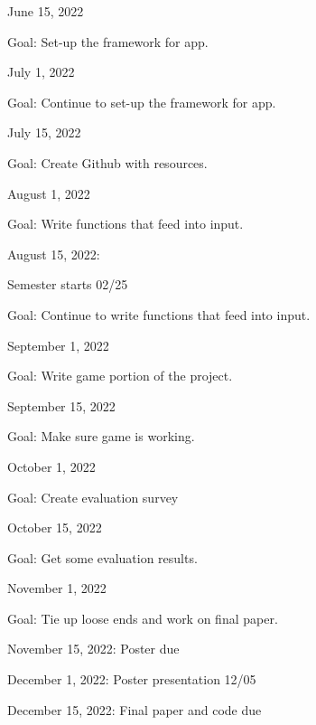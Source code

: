 \documentclass[10pt,twocolumn]{article}
\begin{document}
June 15, 2022

Goal: Set-up the framework for app.

July 1, 2022

Goal: Continue to set-up the framework for app.

July 15, 2022

Goal: Create Github with resources.

August 1, 2022

Goal: Write functions that feed into input.

August 15, 2022:

Semester starts 02/25

Goal: Continue to write functions that feed into input.

September 1, 2022

Goal: Write game portion of the project.

September 15, 2022

Goal: Make sure game is working.

October 1, 2022

Goal: Create evaluation survey 

October 15, 2022

Goal: Get some evaluation results.

November 1, 2022

Goal: Tie up loose ends and work on final paper.

November 15, 2022:
Poster due

December 1, 2022:
Poster presentation 12/05

December 15, 2022:
Final paper and code due



\printbibliography 
\end{document}
